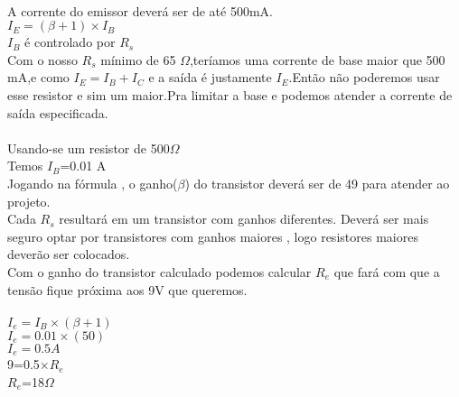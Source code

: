 \documentclass[11pt,a4paper]{article}
\begin{document}
	\\
	A corrente do emissor deverá ser de até 500mA.\\
	$I_E=(\beta+1)\times I_B$\\
    $I_B$ é controlado por $R_s$\\
	Com o nosso $R_s$ mínimo de 65 $\Omega$,teríamos uma corrente de base maior que 500 mA,e como $I_E=I_B+I_C$ e a saída é justamente $I_E$.Então não poderemos usar esse resistor e sim um maior.Pra limitar a base e podemos atender a corrente de saída especificada.\\\\
	Usando-se um resistor de 500$\Omega$\\
	Temos $I_B$=0.01 A\\
	Jogando na fórmula , o ganho($\beta$) do transistor deverá ser de 49 para atender ao projeto.\\
	Cada $R_s$ resultará em um transistor com ganhos diferentes. Deverá ser mais seguro optar por transistores com ganhos maiores , logo resistores maiores deverão ser colocados.\\
	Com o ganho do transistor calculado podemos calcular $R_e$ que fará com que a tensão fique próxima aos 9V que queremos.\\\\
	$I_e=I_B\times(\beta + 1)$\\
	$I_e=0.01\times(50)$\\
	$I_e=0.5 A $\\
	9=0.5$\times R_e$\\
	$R_e$=18$\Omega$
	
\end{document}
